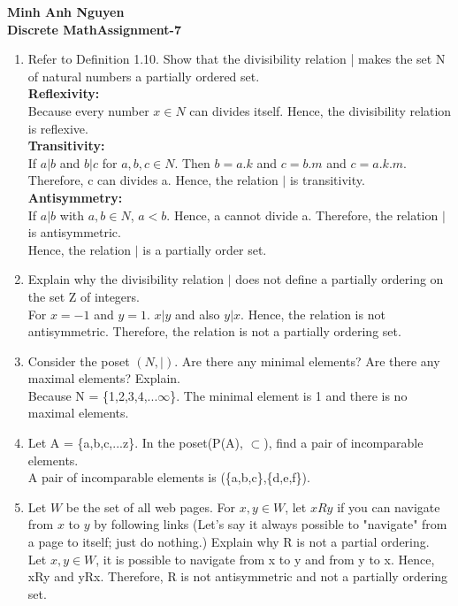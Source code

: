 \documentclass[12pt]{article}
\begin{document}
\textbf{Minh Anh Nguyen }\\
\textbf{Discrete Math\hfill Assignment-7}

\hrulefill

\begin{enumerate}

  \item Refer to Definition 1.10. Show that the divisibility relation | makes the set N of natural numbers a partially ordered set.\\
  \textbf{Reflexivity:}\\
  Because every number $x \in N$ can divides itself. Hence, the divisibility relation is reflexive.\\
  \textbf{Transitivity:}\\
  If $a|b$ and $b|c$ for $a,b,c \in N$. Then $b = a.k$ and $c = b.m$ and $c = a.k.m$. Therefore, c can divides a. Hence, the relation $|$ is transitivity.\\
  \textbf{Antisymmetry:}\\
  If $a|b$ with $a,b \in N$, $a < b$. Hence, a cannot divide a. Therefore, the relation $|$ is antisymmetric.\\
  Hence, the relation $|$ is a partially order set.
  \item Explain why the divisibility relation $|$ does not define a partially ordering on the set Z of integers.\\
  For $x = -1$ and $y = 1$. $x|y$ and also $y|x$. Hence, the relation is not antisymmetric. Therefore, the relation is not a partially ordering set.
  \item Consider the poset $(N,|)$. Are there any minimal elements? Are there any maximal elements? Explain.\\
  Because N = \{1,2,3,4,...$\infty$\}. The minimal element is 1 and there is no maximal elements.
  \item Let A = \{a,b,c,...z\}. In the poset(P(A), $\subset$), find a pair of incomparable elements.\\
  A pair of incomparable elements is (\{a,b,c\},\{d,e,f\}).
  \item Let $W$ be the set of all web pages. For $x, y \in W$, let $x R y$ if you can navigate from $x$ to $y$ by following links (Let's say it always possible to "navigate" from a page to itself; just do nothing.) Explain why R is not a partial ordering.\\
  Let $x,y \in W$, it is possible to navigate from x to y and from y to x. Hence, xRy and yRx. Therefore, R is not antisymmetric and not a partially ordering set.

\end{enumerate}
\end{document}
